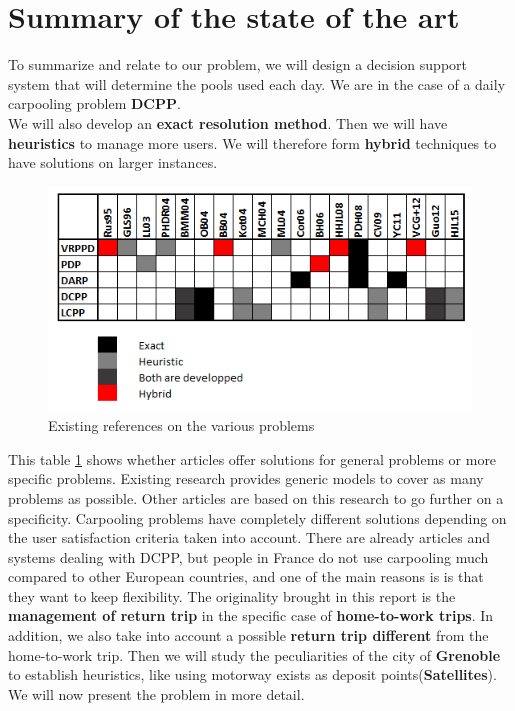 \documentclass[12pt, a4paper,twoside]{memoir}
\newcommand{\newpar}{\vskip 0.2in \noindent}
\begin{document}
	\section{Summary of the state of the art}
	
	To summarize and relate to our problem, we will design a decision support system that will determine the pools used each day. We are in the case of a daily carpooling problem \textbf{DCPP}. \\
	We will also develop an \textbf{exact resolution method}. Then we will have \textbf{heuristics} to manage more users. We will therefore form \textbf{hybrid} techniques to have solutions on larger instances.
	
	\begin{figure}[H]
		\centering
		\begin{flushleft}
			\includegraphics[scale=1.1]{img/i_table.png}
		\end{flushleft}
		\caption{Existing references on the various problems}
		\label{fig:Existing references on the different problems}
	\end{figure} 
	
	This table \ref{fig:Existing references on the different problems} shows whether articles offer solutions for general problems or more specific problems. Existing research provides generic models to cover as many problems as possible. Other articles are based on this research to go further on a specificity. Carpooling problems have completely different solutions depending on the user satisfaction criteria taken into account.
	\newpar
	There are already articles and systems dealing with DCPP, but people in France do not use carpooling much compared to other European countries, and one of the main reasons is is that they want to keep flexibility. \newline
	The originality brought in this report is the \textbf{management of return trip} in the specific case of \textbf{home-to-work trips}. \newline
	In addition, we also take into account a possible \textbf{return trip different} from the home-to-work trip. \newline
	Then we will study the peculiarities of the city of \textbf{Grenoble} to establish heuristics, like using motorway exists as deposit points(\textbf{Satellites}). 
	\newpar
	We will now present the problem in more detail.
	
\end{document}
